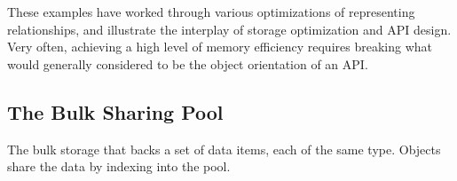 These examples have worked through various optimizations of representing
relationships, and illustrate the interplay of storage optimization and API
design. Very often, achieving a high level of memory efficiency requires breaking
what would generally considered to be the object orientation of an API.

\subsection{The Bulk Sharing Pool}
\label{sec:bulk-sharing-pool}

The bulk storage that backs a set of data items, each of the same type. Objects
share the data by indexing into the pool.

\begin{figure}
\centering
	\quad
	\quad

\end{figure}
